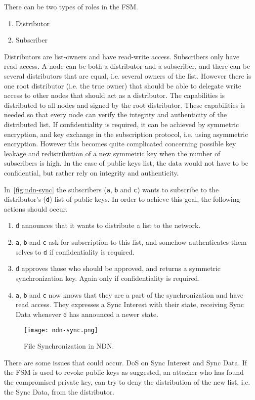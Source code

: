 There can be two types of roles in the \gls{FSM}. 
\begin{enumerate}
	\item Distributor
	\item Subscriber
\end{enumerate}
Distributors are list-owners and have read-write access.
Subscribers only have read access.
A node can be both a distributor and a subscriber, and there can be several distributors that are equal, i.e. several owners of the list.
However there is one root distributor (i.e. the true owner) that should be able to delegate write access to other nodes that should act as a distributor. 
The capabilities is distributed to all nodes and signed by the root distributor.
These capabilities is needed so that every node can verify the integrity and authenticity of the distributed list.
If confidentiality is required, it can be achieved by symmetric encryption, and key exchange in the subscription protocol, i.e. using asymmetric encryption.
However this becomes quite complicated concerning possible key leakage and redistribution of a new symmetric key when the number of subscribers is high. 
In the case of public keys list, the data would not have to be confidential, but rather rely on integrity and authenticity.

In~\autoref{fig:ndn-sync} the subscribers (\texttt{a}, \texttt{b} and \texttt{c}) wants to subscribe to the distributor's (\texttt{d}) list of public keys.
In order to achieve this goal, the following actions should occur.
\begin{enumerate}
	\item \texttt{d} announces that it wants to distribute a list to the network. 
	\item \texttt{a}, \texttt{b} and \texttt{c} ask for subscription to this list, and somehow authenticates them selves to \texttt{d} if confidentiality is required.
	\item \texttt{d} approves those who should be approved, and returns a symmetric synchronization key. 
	Again only if confidentiality is required.
	\item \texttt{a}, \texttt{b} and \texttt{c} now knows that they are a part of the synchronization and have read access. They expresses a Sync Interest with their state, receiving Sync Data whenever \texttt{d} has announced a newer state.
\end{enumerate}

\begin{figure}[ht]
  \centering
  \texttt{[image: ndn-sync.png]}
  \caption{File Synchronization in NDN.}
  \label{fig:ndn-sync}
\end{figure}

There are some issues that could occur. 
\gls{DoS} on Sync Interest and Sync Data. 
If the \gls{FSM} is used to revoke public keys as suggested, an attacker who has found the compromised private key, can try to deny the distribution of the new list, i.e. the Sync Data, from the distributor. 
